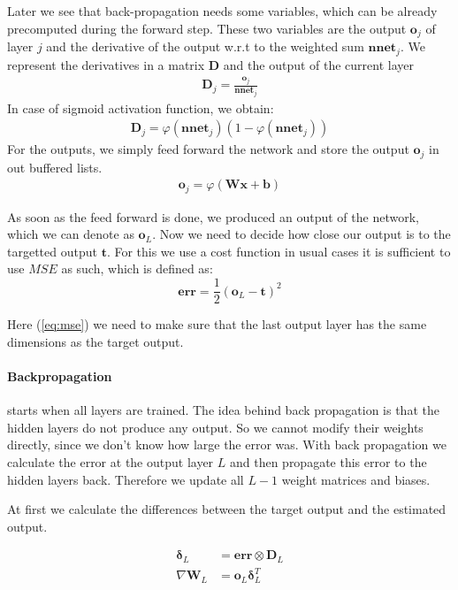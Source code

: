 \documentclass{acm_proc_article-sp}
\begin{document}
Later we see that back-propagation needs some variables, which can be already precomputed during the forward step. These two variables are the output $\mathbf{o}_j$ of layer $j$ and the derivative of the output w.r.t to the weighted sum $\mathbf{nnet}_j$. We represent the derivatives in a matrix $\mathbf{D}$ and the output of the current layer
\begin{align}
\mathbf{D}_j = \frac{\mathbf{o}_j}{\mathbf{nnet}_j}
\end{align}
In case of sigmoid activation function, we obtain:
\begin{align}
\mathbf{D}_j = \varphi \left( \mathbf{nnet}_j \right) \left( 1 - \varphi \left(\mathbf{nnet}_j \right) \right)
\end{align}
For the outputs, we simply feed forward the network and store the output $\mathbf{o}_j$ in out buffered lists.
\begin{align}
\mathbf{o}_j = \varphi \left( \mathbf{Wx+b} \right)
\end{align}

As soon as the feed forward is done, we produced an output of the network, which we can denote as $\mathbf{o}_L$. Now we need to decide how close our output is to the targetted output $\mathbf{t}$. For this we use a cost function in usual cases it is sufficient to use $MSE$ as such, which is defined as:
\begin{equation}
\label{eq:mse}
\mathbf{err} = \frac{1}{2} \left( \mathbf{o}_L - \mathbf{t} \right) ^2
\end{equation}

Here (\ref{eq:mse}) we need to make sure that the last output layer has the same dimensions as the target output.


\paragraph{Backpropagation} starts when all layers are trained. The idea behind back propagation is that the hidden layers do not produce any output. So we cannot modify their weights directly, since we don’t know how large the error was. With back propagation we calculate the error at the output layer $L$ and then propagate this error to the hidden layers back. Therefore we update all $L-1$ weight matrices and biases.

At first we calculate the differences between the target output and the estimated output.

\begin{align}
\boldsymbol{\delta}_L &= \mathbf{err} \otimes \mathbf{D}_L\\
\nabla \mathbf{W}_L &= \mathbf{o}_L \boldsymbol{\delta}_L^T
\end{align}
\end{document}
